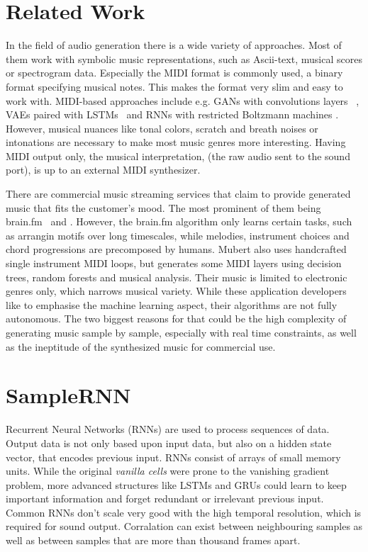 \documentclass[12pt]{article}
\begin{document}
\section{Related Work}
In the field of audio generation there is a wide variety of approaches.
Most of them work with symbolic music representations, such as Ascii-text, musical scores or spectrogram data.
Especially the MIDI format is commonly used, a binary format specifying musical notes.
This makes the format very slim and easy to work with.
MIDI-based approaches include e.g. GANs with convolutions layers ~\cite{yang2017midinet, mogren2016c, mogren2016c}, VAEs paired with LSTMs~\cite{roberts2018hierarchical, tikhonov2017music, hennig2017classifying} and RNNs with restricted Boltzmann machines \cite{boulanger2012modeling}.
However, musical nuances like tonal colors, scratch and breath noises or intonations are necessary to make most music genres more interesting.
Having MIDI output only, the musical interpretation, (the raw audio sent to the sound port), is up to an external MIDI synthesizer.

There are commercial music streaming services that claim to provide generated music that fits the customer's mood.
The most prominent of them being brain.fm~\cite{brain.fm} and \cite{Mubert}.
However, the brain.fm algorithm only learns certain tasks, such as arrangin motifs over long timescales, while melodies, instrument choices and chord progressions are precomposed by humans.
Mubert also uses handcrafted single instrument MIDI loops, but generates some MIDI layers using decision trees, random forests and musical analysis.
Their music is limited to electronic genres only, which narrows musical variety.
While these application developers like to emphasise the machine learning aspect, their algorithms are not fully autonomous.
The two biggest reasons for that could be the high complexity of generating music sample by sample, especially with real time constraints, as well as the ineptitude of the synthesized music for commercial use.




\section{SampleRNN}
Recurrent Neural Networks (RNNs) are used to process sequences of data.
Output data is not only based upon input data, but also on a hidden state vector, that encodes previous input.
RNNs consist of arrays of small memory units.
While the original \emph{vanilla cells} were prone to the vanishing gradient problem, more advanced structures like LSTMs and GRUs could learn to keep important information and forget redundant or irrelevant previous input.
Common RNNs don't scale very good with the high temporal resolution, which is required for sound output.
Corralation can exist between neighbouring samples as well as between samples that are more than thousand frames apart.
\end{document}
